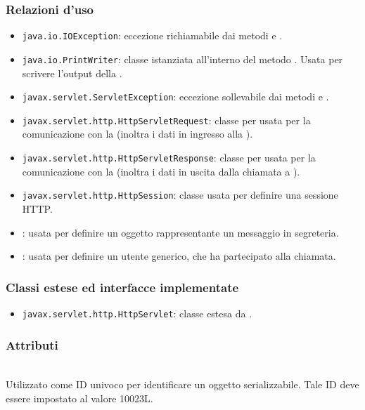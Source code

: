 \subsubsection*{Relazioni d'uso}
\begin{itemize}
	\item \texttt{java.io.IOException}: eccezione richiamabile dai metodi  e .
	\item \texttt{java.io.PrintWriter}: classe istanziata all'interno del metodo . Usata per scrivere l'output della .
	\item \texttt{javax.servlet.ServletException}: eccezione sollevabile dai metodi  e .
	\item \texttt{javax.servlet.http.HttpServletRequest}:  classe per usata per la comunicazione con la  (inoltra i dati in ingresso alla ).
	\item \texttt{javax.servlet.http.HttpServletResponse}: classe per usata per la comunicazione con la  (inoltra i dati in uscita dalla chiamata a ).
	\item \texttt{javax.servlet.http.HttpSession}: classe usata per definire una sessione HTTP.
	\item {}: usata per definire un oggetto rappresentante un messaggio in segreteria.
	\item {}: usata per definire un utente generico, che ha partecipato alla chiamata.
\end{itemize}

\subsubsection*{Classi estese ed interfacce implementate}
\begin{itemize}
	\item \texttt{javax.servlet.http.HttpServlet}: classe estesa da .
\end{itemize}

\subsubsection*{Attributi}
\begin{description}
  \item{}\\
  Utilizzato come ID univoco per identificare un oggetto serializzabile. Tale ID deve essere impostato al valore 10023L.
\end{description}

